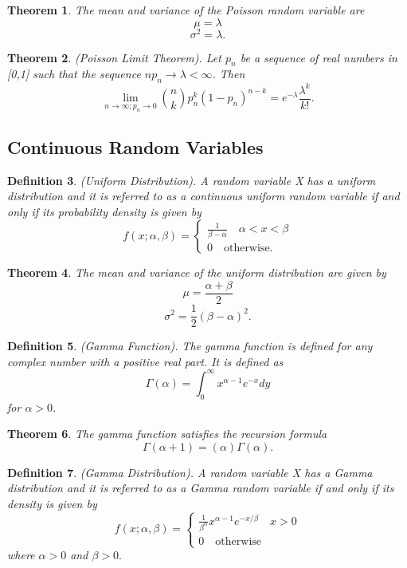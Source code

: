\documentclass[twoside]{article}
\newcounter{lecnum}
\newtheorem{theorem}{Theorem}[lecnum]
\newtheorem{definition}[theorem]{Definition}
\begin{document}
\begin{theorem}The mean and variance of the Poisson random variable are 
$$
\mu = \lambda
$$
$$
\sigma^2 = \lambda.
$$
\end{theorem}

\begin{theorem}(Poisson Limit Theorem). Let $p_n$ be a sequence of real numbers in [0,1] such that the sequence $np_n \rightarrow \lambda < \infty$. Then 
$$
\lim_{n \rightarrow \infty;p_n \rightarrow 0}{n \choose k}p_{n}^{k}(1-p_n)^{n-k} = e^{-\lambda}\frac{\lambda^k}{k!}.
$$
\end{theorem}

\subsection{Continuous Random Variables}

\begin{definition}(Uniform Distribution). A random variable X has a uniform distribution and it is referred to as a continuous uniform random variable if and only if its probability density is given by 
$$
f(x;\alpha, \beta) = \begin{cases}
\frac{1}{\beta - \alpha} \quad \alpha < x < \beta \\
0 \quad \text{otherwise}.

\end{cases}
$$
\end{definition}

\begin{theorem}The mean and variance of the uniform distribution are given by 
$$
\mu = \frac{\alpha + \beta}{2}
$$
$$
\sigma^2 = \frac{1}{2}(\beta - \alpha)^2.
$$
\end{theorem}


\begin{definition}(Gamma Function). The gamma function is defined for any complex number with a positive real part. It is defined as 
$$
\Gamma(\alpha) = \int_{0}^{\infty}x^{\alpha - 1}e^{-x}dy
$$
for $\alpha > 0$.
\end{definition}

\begin{theorem}The gamma function satisfies the recursion formula 
$$
\Gamma(\alpha + 1) = (\alpha)\Gamma(\alpha).
$$
\end{theorem}

\begin{definition}(Gamma Distribution). A random variable X has a Gamma distribution and it is referred to as a Gamma random variable if and only if its density is given by 
$$
f(x; \alpha, \beta) = \begin{cases}
\frac{1}{\beta^{\alpha}}x^{\alpha - 1}e^{-x/\beta} \quad x > 0\\
0 \quad \text{otherwise}
\end{cases}
$$
where $\alpha > 0$ and $\beta > 0.$
\end{definition}
\end{document}

